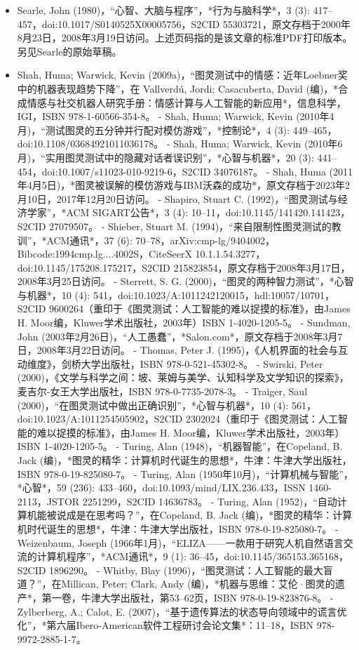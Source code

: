 \begin{itemize}
\item Searle, John (1980)，“心智、大脑与程序”，*行为与脑科学*，3 (3): 417–457，doi:10.1017/S0140525X00005756，S2CID 55303721，原文存档于2000年8月23日，2008年3月19日访问。上述页码指的是该文章的标准PDF打印版本。另见Searle的原始草稿。
\item Shah, Huma; Warwick, Kevin (2009a)，“图灵测试中的情感：近年Loebner奖中的机器表现趋势下降”，在 Vallverdú, Jordi; Casacuberta, David (编)，*合成情感与社交机器人研究手册：情感计算与人工智能的新应用*，信息科学，IGI，ISBN 978-1-60566-354-8。
- Shah, Huma; Warwick, Kevin (2010年4月)，“测试图灵的五分钟并行配对模仿游戏”，*控制论*，4 (3): 449–465，doi:10.1108/03684921011036178。
- Shah, Huma; Warwick, Kevin (2010年6月)，“实用图灵测试中的隐藏对话者误识别”，*心智与机器*，20 (3): 441–454，doi:10.1007/s11023-010-9219-6，S2CID 34076187。
- Shah, Huma (2011年4月5日)，*图灵被误解的模仿游戏与IBM沃森的成功*，原文存档于2023年2月10日，2017年12月20日访问。
- Shapiro, Stuart C. (1992)，“图灵测试与经济学家”，*ACM SIGART公告*，3 (4): 10–11，doi:10.1145/141420.141423，S2CID 27079507。
- Shieber, Stuart M. (1994)，“来自限制性图灵测试的教训”，*ACM通讯*，37 (6): 70–78，arXiv:cmp-lg/9404002，Bibcode:1994cmp.lg....4002S，CiteSeerX 10.1.1.54.3277，doi:10.1145/175208.175217，S2CID 215823854，原文存档于2008年3月17日，2008年3月25日访问。
- Sterrett, S. G. (2000)，“图灵的两种智力测试”，*心智与机器*，10 (4): 541，doi:10.1023/A:1011242120015，hdl:10057/10701，S2CID 9600264（重印于《图灵测试：人工智能的难以捉摸的标准》，由James H. Moor编，Kluwer学术出版社，2003年）ISBN 1-4020-1205-5。
- Sundman, John (2003年2月26日)，“人工愚蠢”，*Salon.com*，原文存档于2008年3月7日，2008年3月22日访问。
- Thomas, Peter J. (1995)，《人机界面的社会与互动维度》，剑桥大学出版社，ISBN 978-0-521-45302-8。
- Swirski, Peter (2000)，《文学与科学之间：坡、莱姆与美学、认知科学及文学知识的探索》，麦吉尔-女王大学出版社，ISBN 978-0-7735-2078-3。
- Traiger, Saul (2000)，“在图灵测试中做出正确识别”，*心智与机器*，10 (4): 561，doi:10.1023/A:1011254505902，S2CID 2302024（重印于《图灵测试：人工智能的难以捉摸的标准》，由James H. Moor编，Kluwer学术出版社，2003年）ISBN 1-4020-1205-5。
- Turing, Alan (1948)，“机器智能”，在Copeland, B. Jack (编)，*图灵的精华：计算机时代诞生的思想*，牛津：牛津大学出版社，ISBN 978-0-19-825080-7。
- Turing, Alan (1950年10月)，“计算机械与智能”，*心智*，59 (236): 433–460，doi:10.1093/mind/LIX.236.433，ISSN 1460-2113，JSTOR 2251299，S2CID 14636783。
- Turing, Alan (1952)，“自动计算机能被说成是在思考吗？”，在Copeland, B. Jack (编)，*图灵的精华：计算机时代诞生的思想*，牛津：牛津大学出版社，ISBN 978-0-19-825080-7。
- Weizenbaum, Joseph (1966年1月)，“ELIZA——一款用于研究人机自然语言交流的计算机程序”，*ACM通讯*，9 (1): 36–45，doi:10.1145/365153.365168，S2CID 1896290。
- Whitby, Blay (1996)，“图灵测试：人工智能的最大盲道？”，在Millican, Peter; Clark, Andy (编)，*机器与思维：艾伦·图灵的遗产*，第一卷，牛津大学出版社，第53–62页，ISBN 978-0-19-823876-8。
- Zylberberg, A.; Calot, E. (2007)，“基于遗传算法的状态导向领域中的谎言优化”，*第六届Ibero-American软件工程研讨会论文集*：11–18，ISBN 978-9972-2885-1-7。
\end{itemize}